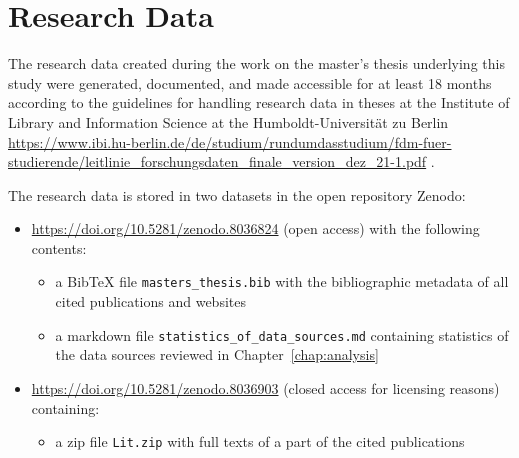 \chapter{Research Data}
\label{chap:DMP}

The research data created during the work on the master's thesis underlying this study 
were generated, documented, and made accessible for at least 18 months
according to the guidelines for handling research data in theses
at the Institute of Library and Information Science at the 
\foreignlanguage{ngerman}{Humboldt-Universität zu Berlin}
\url{https://www.ibi.hu-berlin.de/de/studium/rundumdasstudium/fdm-fuer-studierende/leitlinie_forschungsdaten_finale_version_dez_21-1.pdf} .

The research data is stored in two datasets in the open repository Zenodo:
%
\begin{itemize}
  \item
    \url{https://doi.org/10.5281/zenodo.8036824} (open access) with the following contents:
    \begin{itemize}
      \item
        a BibTeX file \verb!masters_thesis.bib! with the bibliographic metadata of all cited publications and websites
      \item
        a markdown file \verb!statistics_of_data_sources.md! containing statistics of the data sources reviewed in Chapter~\ref{chap:analysis}
    \end{itemize}
  \item
    \url{https://doi.org/10.5281/zenodo.8036903} (closed access for licensing reasons) containing:
    \begin{itemize}
      \item
        a zip file \verb!Lit.zip! with full texts of a part of the cited publications
    \end{itemize}    
\end{itemize}



%
%


